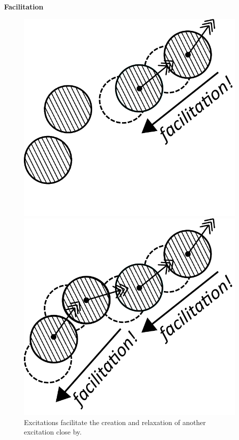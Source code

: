 \begin{frame}[t]
\begin{columns}[T]
\begin{column}[T]{0.50\textwidth}
\centering\textbf{\Large Facilitation}
\begin{figure}[t]
\begin{center}
\begin{overprint}
\centerline{\includegraphics[height=0.525\textheight]{a.2-intro_dftheory/facilitation_closer_1.pdf}}
\centerline{\includegraphics[height=0.525\textheight]{a.2-intro_dftheory/facilitation_closer_2.pdf}}
\end{overprint}
\end{center}
\caption{Excitations facilitate the creation and relaxation of another excitation close by.}
\end{figure}

\end{column}
\end{columns}

\end{frame}